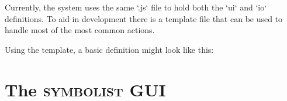 \documentclass{article}
\def\symbolist{\textsc{symbolist}\xspace}
\def\oscfontsize{\footnotesize}
\begin{document}
Currently, the system uses the same `.js` file to hold both the `ui` and `io` definitions. To aid in development there is a template file that can be used to handle most of the most common actions.

Using the template, a basic definition might look like this:

%
%
%
%
%
%
%            
%
%
%
%        
%    
%
%
%
%
%
%
%
%
%    
%
%




\section{The \symbolist GUI}\label{editor}
\end{document}
